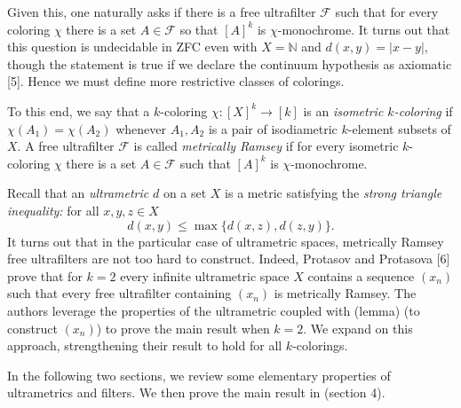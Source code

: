 Given this, one naturally asks if there is a free ultrafilter \( \mathcal{F}  \) such that for every coloring \( \chi \) there is a set \( A \in \mathcal{F}  \) so that \( [A]^{k}  \) is \( \chi \)-monochrome. It turns out that this question is undecidable in ZFC even with \( X = \mathbb{N}  \) and \( d(x,y) = |x-y| \), though the statement is true if we declare the continuum hypothesis as axiomatic [5]. Hence we must define more restrictive classes of colorings.

To this end, we say that a \( k \)-coloring \( \chi : [X]^{k} \to [k]  \) is an \emph{isometric \( k \)-coloring} if \( \chi (A_1) = \chi (A_2) \) whenever \( A_1, A_2 \) is a pair of isodiametric \( k \)-element subsets of \( X \). A free ultrafilter \( \mathcal{F}  \) is called \emph{metrically Ramsey} if for every isometric \( k \)-coloring \( \chi \) there is a set \( A \in \mathcal{F}  \) such that \( [A]^{k}  \) is \( \chi \)-monochrome.

Recall that an \emph{ultrametric} \( d \) on a set \( X \) is a metric satisfying the \emph{strong triangle inequality:} for all \( x,y,z \in X \) \[ d(x,y) \leq \max \{ d(x,z), d(z,y) \}.  \]
It turns out that in the particular case of ultrametric spaces, metrically Ramsey free ultrafilters are not too hard to construct. Indeed, Protasov and Protasova [6] prove that for \( k = 2 \) every infinite ultrametric space \( X \) contains a sequence \( (x_{n}) \) such that every free ultrafilter containing \( (x_{n}) \) is metrically Ramsey. The authors leverage the properties of the ultrametric coupled with (lemma) (to construct \( (x_{n}) \)) to prove the main result when \( k = 2 \). We expand on this approach, strengthening their result to hold for all \( k \)-colorings.

In the following two sections, we review some elementary properties of ultrametrics and filters. We then prove the main result in (section 4).

